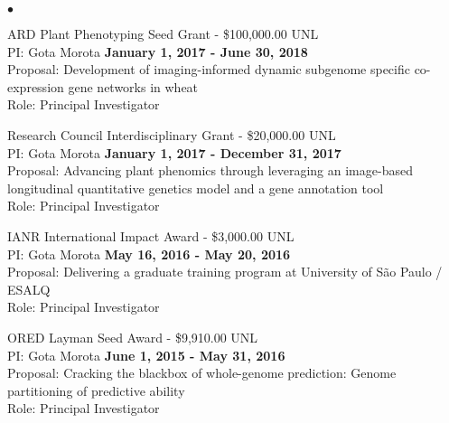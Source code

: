 \documentclass[margin,line,10pt]{res}
\newenvironment{list2}{
  \begin{list}{$\bullet$}{%
      \setlength{\itemsep}{0in}
      \setlength{\parsep}{0in} \setlength{\parskip}{0in}
      \setlength{\topsep}{0in} \setlength{\partopsep}{0in} 
      \setlength{\leftmargin}{0.2in}}}{\end{list}}
\begin{document}
\begin{resume}
\begin{list2}
\vspace{0.5cm}
  
\item ARD Plant Phenotyping Seed Grant  - \$100,000.00  \hfill UNL\\
PI: Gota Morota   \hfill \textbf{January 1, 2017 - June 30, 2018}\\
Proposal: Development of imaging-informed dynamic subgenome specific co-expression gene networks in wheat  \\
Role: Principal Investigator \\

\vspace{0.5cm}

\item Research Council Interdisciplinary Grant  - \$20,000.00  \hfill UNL\\
PI: Gota Morota   \hfill \textbf{January 1, 2017 - December 31, 2017}\\
Proposal: Advancing plant phenomics through leveraging an image-based longitudinal quantitative genetics model and a gene annotation tool  \\
Role: Principal Investigator \\

\vspace{0.5cm}


\item IANR International Impact Award - \$3,000.00  \hfill UNL\\
PI: Gota Morota   \hfill \textbf{May 16, 2016 - May 20, 2016}\\
Proposal: Delivering a graduate training program at University of S{\~a}o Paulo / ESALQ  \\
Role: Principal Investigator \\ 

\vspace{0.5cm}

\item ORED Layman Seed Award - \$9,910.00  \hfill UNL\\
PI: Gota Morota   \hfill \textbf{June 1, 2015 - May 31, 2016}\\
Proposal: Cracking the blackbox of whole-genome prediction: Genome partitioning of predictive ability \\
Role: Principal Investigator \\


\end{list2}



\vspace{0.5cm}

\end{resume}
\end{document}

